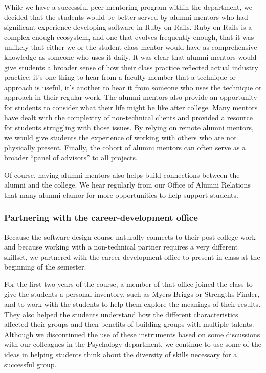 While we have a successful peer mentoring program within the department,
we decided that the students would be better served by alumni mentors
who had significant experience developing software in Ruby on Rails.
Ruby on Rails is a complex enough ecosystem, and one that evolves
frequently enough, that it was unlikely that either we or the student class
mentor would have as comprehensive knowledge as someone who uses
it daily.  It was clear that alumni mentors would give students a
broader sense of how their class practice reflected actual industry
practice; it's one thing to hear from a faculty member that a
technique or approach is useful, it's another to hear it from someone
who uses the technique or approach in their regular work.  The
alumni mentors also provide an opportunity for students to consider
what their life might be like after college.  Many mentors have
dealt with the complexity of non-technical clients and provided a
resource for students struggling with those issues.  By relying on
remote alumni mentors, we would give students the experience of
working with others who are not physically present.  Finally, the
cohort of alumni mentors can often serve as a broader ``panel of
advisors'' to all projects.

Of course, having alumni mentors also helps build connections between
the alumni and the college.  We hear regularly from our Office of
Alumni Relations that many alumni clamor for more opportunities to
help support students.

\subsubsection{Partnering with the career-development office}

Because the software design course naturally connects to their
post-college work and because working with a non-technical partner
requires a very different skillset, we partnered with the 
career-development office to present in class at the beginning
of the semester. 

For the first two years of the course, a member of that office
joined the class to give the students a personal 
inventory, such as Myers-Briggs or Strengths Finder, and to work
with the students to help them explore the meanings of their results.
They also helped the students understand how the different
characteristics affected their groups and then benefits of building
groups with multiple talents.  Although we discontinued the use of
these instruments based on some discussions with our colleagues in
the Psychology department, we continue to use some of the ideas in
helping students think about the diversity of skills necessary for
a successful group.

